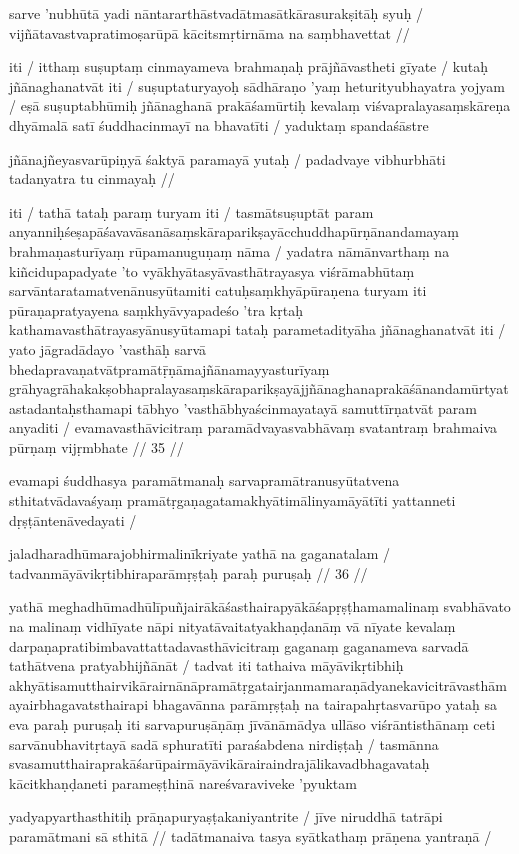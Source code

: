 sarve 'nubhūtā yadi nāntararthāstvadātmasātkārasurakṣitāḥ syuḥ  /
vijñātavastvapratimoṣarūpā kācitsmṛtirnāma na saṃbhavettat  //

iti  / itthaṃ suṣuptaṃ cinmayameva brahmaṇaḥ prājñāvastheti gīyate  / kutaḥ jñānaghanatvāt iti  / suṣuptaturyayoḥ sādhāraṇo 'yaṃ heturityubhayatra yojyam  / eṣā suṣuptabhūmiḥ jñānaghanā prakāśamūrtiḥ kevalaṃ viśvapralayasaṃskāreṇa dhyāmalā satī śuddhacinmayī na bhavatīti  / yaduktaṃ spandaśāstre

jñānajñeyasvarūpiṇyā śaktyā paramayā yutaḥ  /
padadvaye vibhurbhāti tadanyatra tu cinmayaḥ  //

iti  / tathā tataḥ paraṃ turyam iti  / tasmātsuṣuptāt param anyanniḥśeṣapāśavavāsanāsaṃskāraparikṣayācchuddhapūrṇānandamayaṃ brahmaṇasturīyaṃ rūpamanuguṇaṃ nāma  / yadatra nāmānvarthaṃ na kiñcidupapadyate 'to vyākhyātasyāvasthātrayasya viśrāmabhūtaṃ sarvāntaratamatvenānusyūtamiti catuḥsaṃkhyāpūraṇena turyam iti pūraṇapratyayena saṃkhyāvyapadeśo 'tra kṛtaḥ kathamavasthātrayasyānusyūtamapi tataḥ parametadityāha jñānaghanatvāt iti  / yato jāgradādayo 'vasthāḥ sarvā bhedapravaṇatvātpramātṝṇāmajñānamayyasturīyaṃ grāhyagrāhakakṣobhapralayasaṃskāraparikṣayājjñānaghanaprakāśānandamūrtyatastadantaḥsthamapi tābhyo 'vasthābhyaścinmayatayā samuttīrṇatvāt param anyaditi  / evamavasthāvicitraṃ paramādvayasvabhāvaṃ svatantraṃ brahmaiva pūrṇaṃ vijṛmbhate  // 35  //

evamapi śuddhasya paramātmanaḥ sarvapramātranusyūtatvena sthitatvādavaśyaṃ pramātṛgaṇagatamakhyātimālinyamāyātīti yattanneti dṛṣṭāntenāvedayati  /

jaladharadhūmarajobhirmalinīkriyate yathā na gaganatalam  /
tadvanmāyāvikṛtibhiraparāmṛṣṭaḥ paraḥ puruṣaḥ  // 36  //

yathā meghadhūmadhūlīpuñjairākāśasthairapyākāśapṛṣṭhamamalinaṃ svabhāvato na malinaṃ vidhīyate nāpi nityatāvaitatyakhaṇḍanāṃ vā nīyate kevalaṃ darpaṇapratibimbavattattadavasthāvicitraṃ gaganaṃ gaganameva sarvadā tathātvena pratyabhijñānāt  / tadvat iti tathaiva māyāvikṛtibhiḥ akhyātisamutthairvikārairnānāpramātṛgatairjanmamaraṇādyanekavicitrāvasthāmayairbhagavatsthairapi bhagavānna parāmṛṣṭaḥ na tairapahṛtasvarūpo yataḥ sa eva paraḥ puruṣaḥ iti sarvapuruṣāṇāṃ jīvānāmādya ullāso viśrāntisthānaṃ ceti sarvānubhavitṛtayā sadā sphuratīti paraśabdena nirdiṣṭaḥ  / tasmānna svasamutthairaprakāśarūpairmāyāvikārairaindrajālikavadbhagavataḥ kācitkhaṇḍaneti parameṣṭhinā nareśvaraviveke 'pyuktam

yadyapyarthasthitiḥ prāṇapuryaṣṭakaniyantrite  /
jīve niruddhā tatrāpi paramātmani sā sthitā  //
tadātmanaiva tasya syātkathaṃ prāṇena yantraṇā  /

